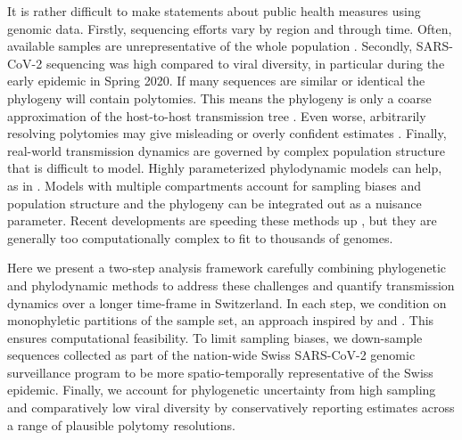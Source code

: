 \documentclass[9pt,twoside,lineno]{pnas-new} %
\begin{document}
It is rather difficult to make statements about public health measures using genomic data. Firstly, sequencing efforts vary by region and through time. Often, available samples are unrepresentative of the whole population \cite{Villabona-Arenas2020, DeMaio2015}. Secondly, SARS-CoV-2 sequencing was high compared to viral diversity, in particular during the early epidemic in Spring 2020. If many sequences are similar or identical the phylogeny will contain polytomies. This means the phylogeny is only a coarse approximation of the  host-to-host transmission tree \cite{Villabona-Arenas2020}. Even worse, arbitrarily resolving polytomies may give misleading or overly confident estimates \cite{Morel2021}. Finally, real-world transmission dynamics are governed by complex population structure that is difficult to model. Highly parameterized phylodynamic models can help, as in \cite{Miller2020, Geoghegan2020a, Muller2020a}. Models with multiple compartments account for sampling biases and population structure and the phylogeny can be integrated out as a nuisance parameter. Recent developments are speeding these methods up \cite{Lemey2021}, but they are generally too computationally complex to fit to thousands of genomes.

Here we present a two-step analysis framework carefully combining phylogenetic and phylodynamic methods to address these challenges and quantify transmission dynamics over a longer time-frame in Switzerland. In each step, we condition on monophyletic partitions of the sample set, an approach inspired by  \cite{Muller2020} and \cite{DuPlessis}. This ensures computational feasibility. To limit sampling biases, we down-sample sequences collected as part of the nation-wide Swiss SARS-CoV-2 genomic surveillance program to be more spatio-temporally representative of the Swiss epidemic. Finally, we account for phylogenetic uncertainty from high sampling and comparatively low viral diversity by conservatively reporting estimates across a range of plausible polytomy resolutions.
\end{document}
